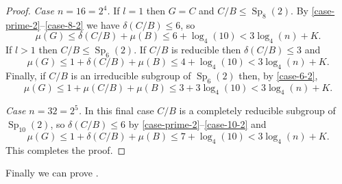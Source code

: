 \documentclass[11pt,reqno]{amsart}
\numberwithin{equation}{section}
\theoremstyle{definition}
\theoremstyle{remark}
\newcommand\opr[1]{\operatorname{#1}}
\def\Sp{\opr{Sp}}
\numberwithin{equation}{section}
\begin{document}
\begin{proof}
    \emph{Case $n = 16 = 2^4$.}
    If $l = 1$ then $G = C$ and $C / B \le \Sp_8(2)$.
    By \ref{case-prime-2}--\ref{case-8-2} we have $\delta(C / B) \le 6$, so
    \[
        \mu(G) \le \delta(C / B) + \mu(B) \le 6 + \log_4(10) < 3 \log_4(n) + K.
    \]
    If $l > 1$ then $C / B \le \Sp_6(2)$.
    If $C / B$ is reducible then $\delta(C / B) \le 3$ and
    \[
        \mu(G) \le 1 + \delta(C / B) + \mu(B) \le 4 + \log_4(10) < 3 \log_4(n) + K.
    \]
    Finally, if $C / B$ is an irreducible subgroup of $\Sp_6(2)$ then, by \ref{case-6-2},
    \[
        \mu(G) \le 1 + \mu(C / B) + \mu(B) \le 3 + 3\log_4(10) < 3 \log_4(n) + K.
    \]

    \emph{Case $n = 32 = 2^5$.}
    In this final case $C / B$ is a completely reducible subgroup of $\Sp_{10}(2)$, so $\delta(C / B) \le 6$ by \ref{case-prime-2}--\ref{case-10-2} and
    \[
        \mu(G) \le 1 + \delta(C / B) + \mu(B) \le 7 + \log_4(10)
        < 3 \log_4(n) + K.
    \]
    This completes the proof.
\end{proof}

Finally we can prove .
\end{document}
